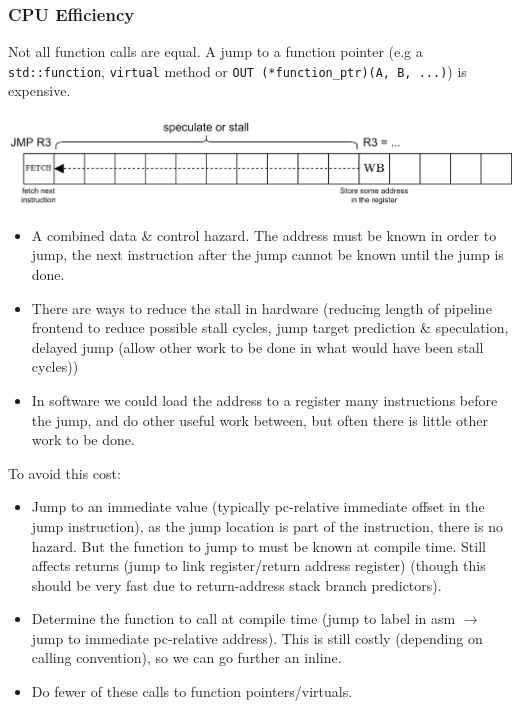 \subsubsection{CPU Efficiency}
\begin{sidenotebox}{Not all function calls are equal.}
  A jump to a function pointer (e.g a \texttt{std::function}, \texttt{virtual} method or \texttt{OUT (*function_ptr)(A, B, ...)}) is expensive.
  \begin{center}
    \includegraphics[width=.8\textwidth]{processing_models/images/jump_to_register.drawio.png}
  \end{center}
  \begin{itemize}
    \item A combined data \& control hazard. The address must be known in order to jump, the next instruction after the jump cannot be known until the jump is done.
    \item There are ways to reduce the stall in hardware (reducing length of pipeline frontend to reduce possible stall cycles, jump target prediction \& speculation, delayed jump (allow other work to be done in what would have been stall cycles))
    \item In software we could load the address to a register many instructions before the jump, and do other useful work between, but often there is little other work to be done.
  \end{itemize}
  To avoid this cost:
  \begin{itemize}
    \item Jump to an immediate value (typically pc-relative immediate offset in the jump instruction), as the jump location is part of the instruction, there is no hazard. But the function to jump to must be known at compile time. Still affects returns (jump to link register/return address register) (though this should be very fast due to return-address stack branch predictors).
    \item Determine the function to call at compile time (jump to label in asm $\to$ jump to immediate pc-relative address). This is still costly (depending on calling convention), so we can go further an inline.
    \item Do fewer of these calls to function pointers/virtuals.
  \end{itemize}
\end{sidenotebox}
